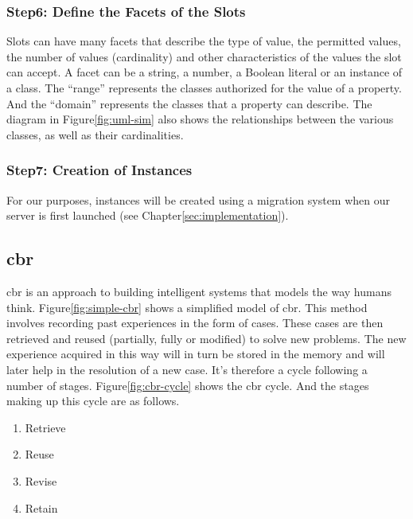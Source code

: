     
    \subsubsection{Step6: Define the Facets of the Slots}
    Slots can have many facets that describe the type of value, the permitted values, the number of values (cardinality) and other characteristics of the values the slot can accept. A facet can be a string, a number, a Boolean literal or an instance of a class. The “range” represents the classes authorized for the value of a property. And the “domain” represents the classes that a property can describe. The diagram in Figure\ref{fig:uml-sim} also shows the relationships between the various classes, as well as their cardinalities.
    
    
    \subsubsection{Step7: Creation of Instances}
    For our purposes, instances will be created using a migration system when our server is first launched (see Chapter\ref{sec:implementation}).
    

\subsection{\acrfull{cbr} \label{subsec:cbr}}
\acrshort{cbr} is an approach to building intelligent systems that models the way humans think. Figure\ref{fig:simple-cbr} shows a simplified model of \acrshort{cbr}. This method involves recording past experiences in the form of cases. These cases are then retrieved and reused (partially, fully or modified) to solve new problems. The new experience acquired in this way will in turn be stored in the memory and will later help in the resolution of a new case. It's therefore a cycle following a number of stages. Figure\ref{fig:cbr-cycle} shows the \acrshort{cbr} cycle. And the stages making up this cycle are as follows.
    
    \begin{enumerate}
        \item Retrieve
        \item Reuse
        \item Revise
        \item Retain
    \end{enumerate}
    
